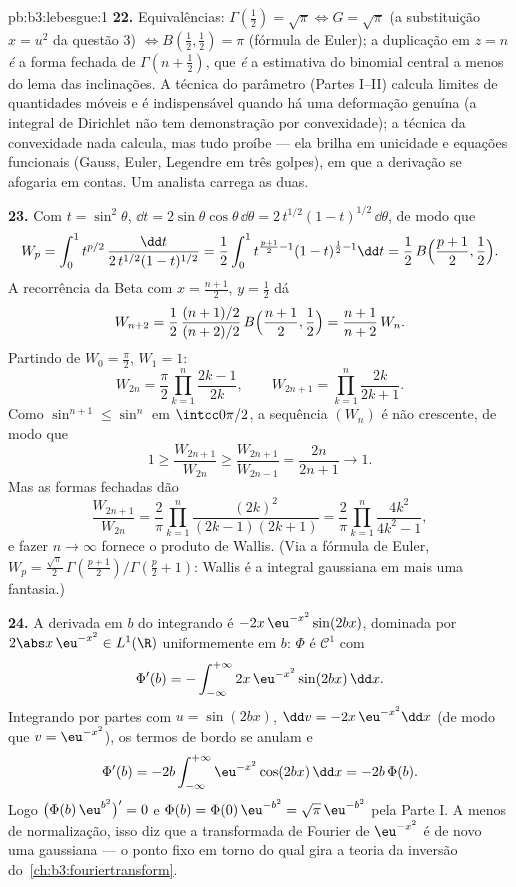 \begin{solution}{pb:b3:lebesgue:1}
\textbf{22.} Equivalências: $\Gamma(\frac12) = \sqrt\pi
\Leftrightarrow G = \sqrt\pi$ (a substituição $x = u^2$ da
questão 3) $\Leftrightarrow B(\frac12, \frac12) = \pi$
(fórmula de Euler); a duplicação em $z = n$ \emph{é} a
forma fechada de $\Gamma(n + \frac12)$, que \emph{é} a
estimativa do binomial central a menos do lema das inclinações. A
técnica do parâmetro (Partes I--II) calcula limites de quantidades
móveis e é indispensável quando há uma deformação genuína
(a integral de Dirichlet não tem demonstração por convexidade); a
técnica da convexidade nada calcula, mas tudo proíbe
--- ela brilha em unicidade e equações funcionais
(Gauss, Euler, Legendre em três golpes), em que a
derivação se afogaria em contas. Um analista 
carrega as duas.

\textbf{23.} Com $t = \sin^2\theta$, $\dd t =
2\sin\theta\cos\theta\,\dd\theta =
2\,t^{1/2}(1-t)^{1/2}\,\dd\theta$, de modo que
\[
W_p = \int_0^1 t^{p/2}\,
\frac{\dd t}{2\,t^{1/2}(1-t)^{1/2}}
= \frac12\int_0^1 t^{\frac{p+1}2 - 1}(1-t)^{\frac12 - 1}\dd t
= \frac12\,B\Bigl(\frac{p+1}2, \frac12\Bigr).
\]
A recorrência da Beta com $x = \frac{n+1}2$, $y = \frac12$
dá
\[
W_{n+2} = \frac12\,
\frac{(n+1)/2}{(n+2)/2}\,B\Bigl(\frac{n+1}2, \frac12\Bigr)
= \frac{n+1}{n+2}\,W_n .
\]
Partindo de $W_0 = \frac\pi2$, $W_1 = 1$:
\[
W_{2n} = \frac\pi2\prod_{k=1}^n\frac{2k-1}{2k},
\qquad
W_{2n+1} = \prod_{k=1}^n\frac{2k}{2k+1} .
\]
Como $\sin^{n+1} \leq \sin^n$ em $\intcc0{\pi/2}$, a
sequência $(W_n)$ é não crescente, de modo que
\[
1 \geq \frac{W_{2n+1}}{W_{2n}} \geq
\frac{W_{2n+1}}{W_{2n-1}} = \frac{2n}{2n+1}
\longrightarrow 1 .
\]
Mas as formas fechadas dão
\[
\frac{W_{2n+1}}{W_{2n}} = \frac2\pi
\prod_{k=1}^n\frac{(2k)^2}{(2k-1)(2k+1)}
= \frac2\pi\prod_{k=1}^n\frac{4k^2}{4k^2-1},
\]
e fazer $n \to \infty$ fornece o produto de Wallis. (Via a
fórmula de Euler, $W_p = \frac{\sqrt\pi}2\,
\Gamma(\frac{p+1}2)/\Gamma(\frac p2 + 1)$: Wallis é a
integral gaussiana em mais uma fantasia.)

\textbf{24.} A derivada em $b$ do integrando é
$-2x\,\eu^{-x^2}\sin(2bx)$, dominada por $2\abs
x\,\eu^{-x^2} \in L^1(\R)$ uniformemente em $b$: $\Phi$ é
$\mathcal C^1$ com
\[
\Phi'(b) = -\int_{-\infty}^{+\infty}
2x\,\eu^{-x^2}\sin(2bx)\,\dd x .
\]
Integrando por partes com $u = \sin(2bx)$, $\dd v =
-2x\,\eu^{-x^2}\dd x$ (de modo que $v = \eu^{-x^2}$), os termos de bordo
se anulam e
\[
\Phi'(b) = -2b\int_{-\infty}^{+\infty}
\eu^{-x^2}\cos(2bx)\,\dd x = -2b\,\Phi(b).
\]
Logo $\bigl(\Phi(b)\,\eu^{b^2}\bigr)' = 0$ e $\Phi(b) =
\Phi(0)\,\eu^{-b^2} = \sqrt\pi\,\eu^{-b^2}$ pela Parte I. A menos de
normalização, isso diz que a transformada de Fourier de
$\eu^{-x^2}$ é de novo uma gaussiana --- o ponto fixo em torno do qual gira
a teoria da inversão do~\cref{ch:b3:fouriertransform}.


\end{solution}
